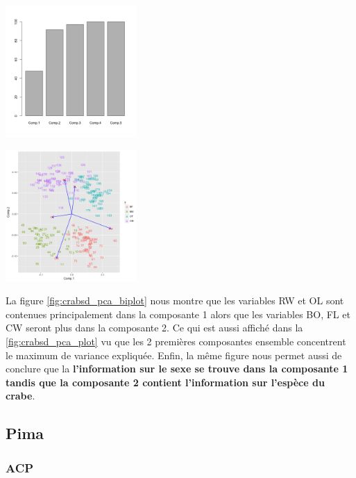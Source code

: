 \documentclass[10pt]{article}
\begin{document}
	\begin{minipage}{.5\textwidth}
		\centering
		\includegraphics[width=50mm]{Figures/Crabs/decorr_pca_plot.png}
		\label{fig:crabsd_pca_plot}
	\end{minipage}%
	\hspace{0.08\linewidth}
	\begin{minipage}{.5\textwidth}
		\centering
		\includegraphics[width=50mm]{Figures/Crabs/decorr_pca_biplot.png}
		\label{fig:crabsd_pca_biplot}
	\end{minipage}
	
	\vspace{2mm}
	La figure  \ref{fig:crabsd_pca_biplot} nous montre que les variables RW et OL sont contenues principalement dans la composante 1 alors que les variables BO, FL et CW seront plus dans la composante 2. Ce qui est aussi affiché dans la \ref{fig:crabsd_pca_plot} vu que les 2 premières composantes ensemble concentrent le maximum de variance expliquée. Enfin, la même figure nous permet aussi de conclure que la \textbf{l'information sur le sexe se trouve dans la composante 1 tandis que la composante 2 contient l'information sur l'espèce du crabe}. 
\subsection{Pima}

\subsubsection{ACP}
\end{document}
